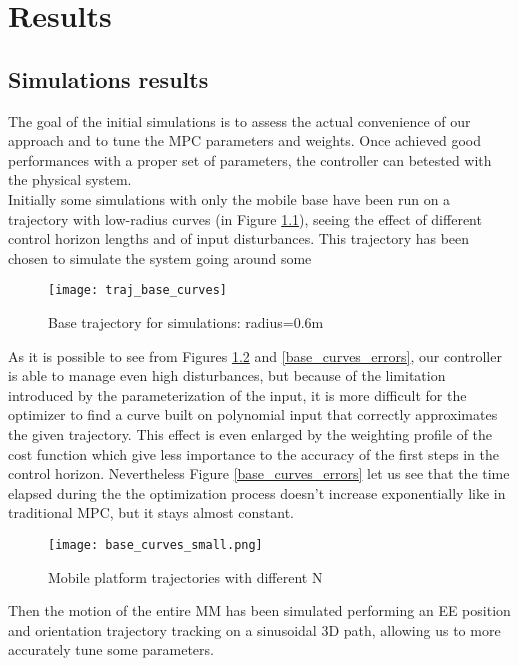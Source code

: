 
\chapter{Results}
\label{chapter7}
\section{Simulations results}
The goal of the initial simulations is to assess the actual convenience of our approach and to tune the MPC parameters and weights. Once achieved good performances with a proper set of parameters, the controller can betested with the physical system.\\
Initially some simulations with only the mobile base have been run on a trajectory with low-radius curves (in Figure \ref{traj_base_curves}), seeing the effect of different control horizon lengths and of input disturbances. This trajectory has been chosen to simulate the system going around some 
\begin{figure}[h!]
\centering
\texttt{[image: traj\_base\_curves]}
\caption{Base trajectory for simulations: radius=0.6m}
\label{traj_base_curves}
\end{figure}
As it is possible to see from Figures \ref{base_curves} and \ref{base_curves_errors}, our controller is able to manage even high disturbances, but because of the limitation introduced by the parameterization of the input, it is more difficult for the optimizer to find a curve built on polynomial input that correctly approximates the given trajectory. This effect is even enlarged by the weighting profile of the cost function which give less importance to the accuracy of the first steps in the control horizon. Nevertheless Figure \ref{base_curves_errors} let us see that the time elapsed during the the optimization process doesn't increase exponentially like in traditional MPC, but it stays almost constant.
\begin{figure}[h!]
	\centering
	\texttt{[image: base\_curves\_small.png]}
	\caption{Mobile platform trajectories with different N}
	\label{base_curves}
\end{figure}
Then the motion of the entire MM has been simulated performing an EE position and orientation trajectory tracking on a sinusoidal 3D path, allowing us to more accurately tune some parameters. 
